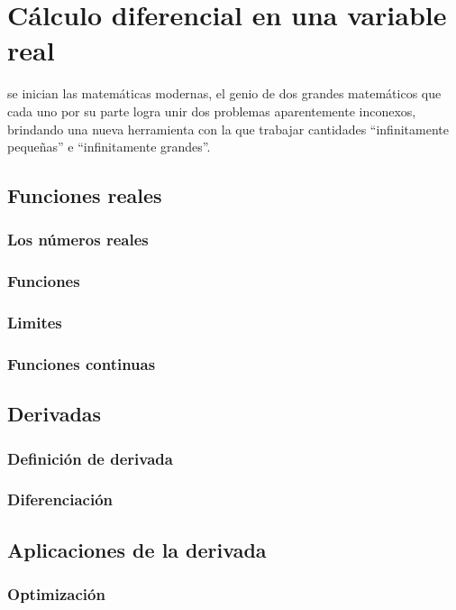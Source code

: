 \chapter{Cálculo diferencial en una variable real} %
\label{cha:calculo_diferencial_de_una_variable_real}

\noindent {} se
inician las matemáticas modernas, el genio de dos grandes matemáticos que cada
uno por su parte logra unir dos problemas aparentemente inconexos, brindando
una nueva herramienta con la que trabajar cantidades ``infinitamente
pequeñas'' e ``infinitamente grandes''. 



\section{Funciones reales} %
\label{sec:funciones reales}

\subsection{Los números reales} %
\label{sub:los_numeros_reales}

\subsection{Funciones} %
\label{sub:funciones}

\subsection{Limites} %
\label{sub:limites}

\subsection{Funciones continuas} %
\label{sub:funciones_continuas}

\section{Derivadas} %
\label{sec:derivadas}

\subsection{Definición de derivada} %
\label{sub:definicion_de_derivada}

\subsection{Diferenciación} %
\label{sub:diferenciacion}

\section{Aplicaciones de la derivada} %
\label{sec:aplicaciones_de_la_derivada}

\subsection{Optimización} %
\label{sub:optimizacion}

